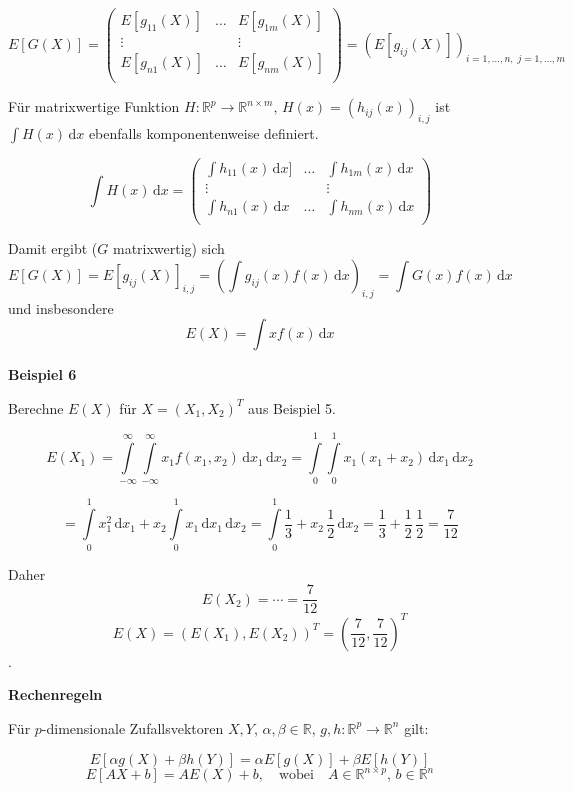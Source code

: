 \documentclass[12pt, a4paper]{article}
\theoremstyle{empty}
\newcommand{\R}{\mathbb{R}}
\newcommand{\1}{\mathds{1}}
\renewcommand{\d}{\,\mathrm{d}}
\providecommand{\mtext}[1]{\quad \text{#1} \quad}
\begin{document}
\[ E[G(X)] =  \begin{pmatrix}

E[g_{11}(X)]  & \ldots & E[g_{1m}(X)] \\
\vdots & & \vdots \\
E[g_{n1}(X)] & \ldots & E[g_{nm}(X)] \\

\end{pmatrix}  =  (E[g_{ij}(X)])_{i = 1, \dots, n, \; j = 1,\dots, m} \]

Für matrixwertige Funktion $  H: \R^p \to \R^{n\times m}, \, H(x) = (h_{ij}(x))_{i,j} $ ist 
$ \int H(x) \d x  $ ebenfalls komponentenweise definiert.

\[ \int H(x) \d x =   \begin{pmatrix}

\int h_{11}(x) \d x]  & \ldots & \int h_{1m}(x) \d x \\
\vdots & & \vdots \\
\int h_{n1}(x) \d x & \ldots & \int h_{nm}(x) \d x \\

\end{pmatrix}  \]

Damit ergibt ($G$ matrixwertig) sich \[ E[G(X)] = E[g_{ij}(X)]_{i,j} = \left(\int g_{ij}(x)f(x)\d x \right)_{i,j} = \int G(x)f(x) \d x \]
und insbesondere \[  E(X) = \int x f(x) \d x   \]

\textbf{Beispiel 6}

Berechne $E(X)$ für $X=(X_1, X_2)^T$ aus Beispiel 5.

\[ E(X_1) = \int\limits_{-\infty}^{\infty} \int\limits_{-\infty}^{\infty} x_1 f(x_1, x_2) \d x_1 \d x_2
 =   \int\limits_{0}^{1} \int\limits_{0}^{1} x_1 (x_1 + x_2) \d x_1 \d x_2  \]
 

 \[=    \int\limits_{0}^{1} x_1^2 \d x_1   + x_2 \int\limits_0^1 x_1 \d x_1 \d x_2
= \int\limits_0^1 \frac{1}{3} + x_2 \, \frac{1}{2} \d x_2 = \frac{1}{3} + \frac{1}{2} \, \frac{1}{2} = \frac{7}{12}\]

Daher \[  E(X_2) = \cdots = \frac{7}{12}    \]
\[ E(X) = (E(X_1), E(X_2))^T = (\frac{7}{12}, \frac{7}{12})^T    \].

\textbf{Rechenregeln}

Für $p$-dimensionale Zufallsvektoren $X,Y$, $\alpha, \beta \in \R$, $g,h: \R^p \to \R^n$ gilt:

\[  E[\alpha g(X) + \beta  h(Y)   ]  = \alpha E[g(X)] + \beta E[h(Y)]   \]
\[  E[AX + b] = AE(X) + b, \mtext{wobei} A \in \R^{n \times p}, \, b \in \R^n   \]
\end{document}
